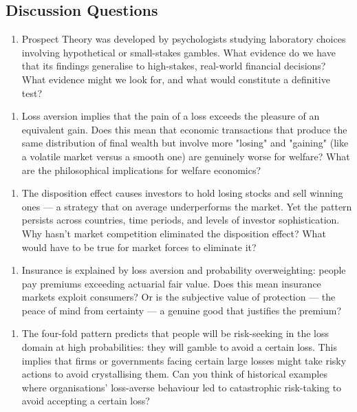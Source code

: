 \documentclass[12pt, letterpaper]{article}
\begin{document}
\subsection{Discussion Questions}


\begin{enumerate}
\item Prospect Theory was developed by psychologists studying laboratory choices involving hypothetical or small-stakes gambles. What evidence do we have that its findings generalise to high-stakes, real-world financial decisions? What evidence might we look for, and what would constitute a definitive test?
\end{enumerate}

\begin{enumerate}
\item Loss aversion implies that the pain of a loss exceeds the pleasure of an equivalent gain. Does this mean that economic transactions that produce the same distribution of final wealth but involve more "losing" and "gaining" (like a volatile market versus a smooth one) are genuinely worse for welfare? What are the philosophical implications for welfare economics?
\end{enumerate}

\begin{enumerate}
\item The disposition effect causes investors to hold losing stocks and sell winning ones --- a strategy that on average underperforms the market. Yet the pattern persists across countries, time periods, and levels of investor sophistication. Why hasn't market competition eliminated the disposition effect? What would have to be true for market forces to eliminate it?
\end{enumerate}

\begin{enumerate}
\item Insurance is explained by loss aversion and probability overweighting: people pay premiums exceeding actuarial fair value. Does this mean insurance markets exploit consumers? Or is the subjective value of protection --- the peace of mind from certainty --- a genuine good that justifies the premium?
\end{enumerate}

\begin{enumerate}
\item The four-fold pattern predicts that people will be risk-seeking in the loss domain at high probabilities: they will gamble to avoid a certain loss. This implies that firms or governments facing certain large losses might take risky actions to avoid crystallising them. Can you think of historical examples where organisations' loss-averse behaviour led to catastrophic risk-taking to avoid accepting a certain loss?
\end{enumerate}
\end{document}
